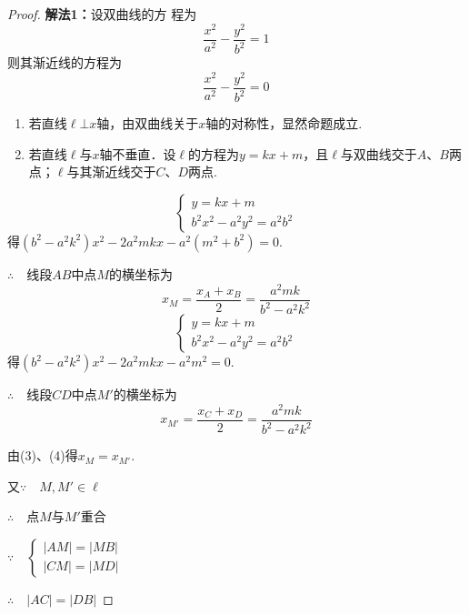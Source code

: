 \begin{proof}
\textbf{解法1：}设双曲线的方
程为
\begin{equation}
    \frac{x^2}{a^2}-\frac{y^2}{b^2}=1\tag{1}
\end{equation}
则其渐近线的方程为
\begin{equation}
    \frac{x^2}{a^2}-\frac{y^2}{b^2}=0 \tag{2}
\end{equation}
\begin{enumerate}[(1)]
\item 若直线$\ell\bot x$轴，由双曲线关于$x$轴的对称性，显然命题成立.
\item 若直线$\ell$与$x$轴不垂直．设$\ell$的方程为$y=kx+m$，且$\ell$与双曲线交于$A$、$B$两点；$\ell$与其渐近线交于$C$、$D$两点. 
\end{enumerate}
\[\begin{cases}
    y=kx+m\\ b^2x^2-a^2y^2=a^2b^2
\end{cases}\]
得$(b^2-a^2k^2)x^2-2a^2mkx-a^2(m^2+b^2)=0$.

$\therefore\quad $线段$AB$中点$M$的横坐标为
\begin{equation}
    x_M=\frac{x_A+x_B}{2}=\frac{a^2mk}{b^2-a^2k^2} \tag{3}
\end{equation}
\[\begin{cases}
    y=kx+m\\ b^2x^2-a^2y^2=a^2b^2
\end{cases}\]
得$(b^2-a^2k^2)x^2-2a^2mkx-a^2m^2=0$.

\noindent
\begin{minipage}{.45\textwidth}\CTEXindent
$\therefore\quad$线段$CD$中点$M'$的横坐标为
\begin{equation}
    x_{M'}=\frac{x_C+x_D}{2}=\frac{a^2mk}{b^2-a^2k^2}  \tag{4}
\end{equation}

由(3)、(4)得$x_M=x_{M'}$.

又$\because\quad M,M'\in\ell$

$\therefore\quad $点$M$与$M'$重合

$\because\quad \begin{cases}
    |AM|=|MB|\\|CM|=|MD|
\end{cases}$

$\therefore\quad |AC|=|DB|$
\end{minipage}
\hfill
\begin{minipage}{.52\textwidth}
\centering
{}
\end{minipage}
\end{proof}
